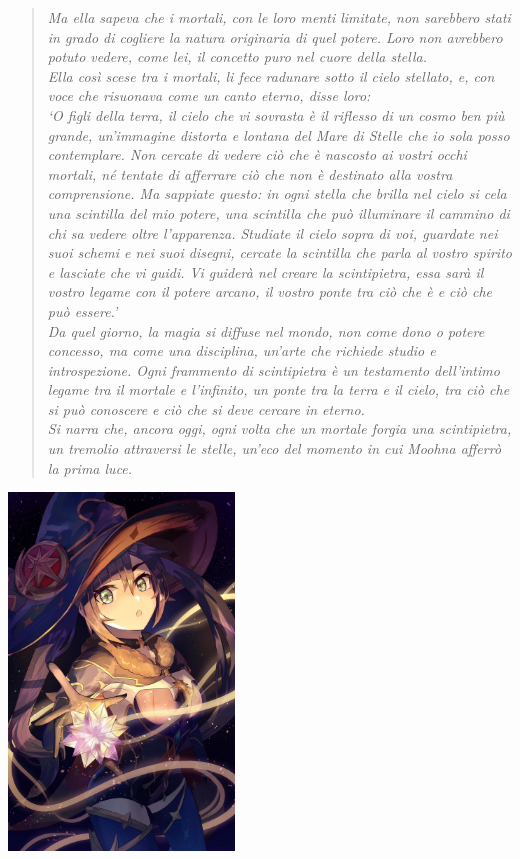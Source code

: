 \documentclass[10pt, a4paper]{report}
\begin{document}
\begin{multicols}{2}
\begin{verse}
\end{verse}
\newcolumn
\begin{verse}
\textit{Ma ella sapeva che i mortali, con le loro menti limitate, non sarebbero stati in grado di cogliere la natura originaria di quel potere. Loro non avrebbero potuto vedere, come lei, il concetto puro nel cuore della stella. \\
Ella così scese tra i mortali, li fece radunare sotto il cielo stellato, e, con voce che risuonava come un canto eterno, disse loro:\\
\enquote*{O figli della terra, il cielo che vi sovrasta è il riflesso di un cosmo ben più grande, un’immagine distorta e lontana del Mare di Stelle che io sola posso contemplare. Non cercate di vedere ciò che è nascosto ai vostri occhi mortali, né tentate di afferrare ciò che non è destinato alla vostra comprensione. Ma sappiate questo: in ogni stella che brilla nel cielo si cela una scintilla del mio potere, una scintilla che può illuminare il cammino di chi sa vedere oltre l’apparenza. Studiate il cielo sopra di voi, guardate nei suoi schemi e nei suoi disegni, cercate la scintilla che parla al vostro spirito e lasciate che vi guidi. Vi guiderà nel creare la scintipietra, essa sarà il vostro legame con il potere arcano, il vostro ponte tra ciò che è e ciò che può essere.}\\
Da quel giorno, la magia si diffuse nel mondo, non come dono o potere concesso, ma come una disciplina, un’arte che richiede studio e introspezione. Ogni frammento di scintipietra è un testamento dell’intimo legame tra il mortale e l’infinito, un ponte tra la terra e il cielo, tra ciò che si può conoscere e ciò che si deve cercare in eterno.\\ Si narra che, ancora oggi, ogni volta che un mortale forgia una scintipietra, un tremolio attraversi le stelle, un’eco del momento in cui Moohna afferrò la prima luce.}
\end{verse}

\includegraphics[width=6cm]{monascintipietra.jpeg}


\end{multicols}
\end{document}
